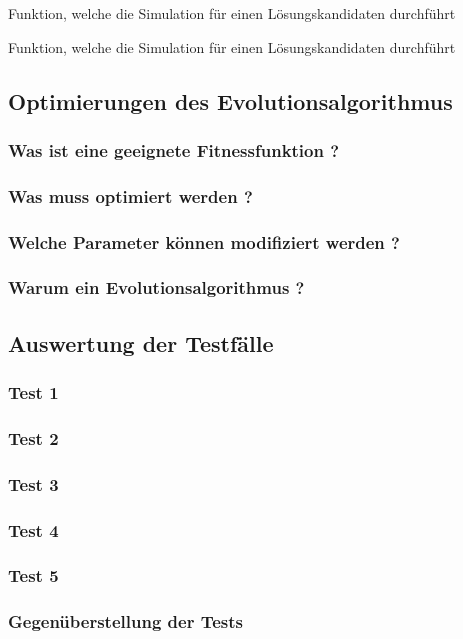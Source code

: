 \begin{code}
\caption{Funktion, welche die Simulation für einen Lösungskandidaten durchführt}
\label{fig:evaluate-m}
\end{code}

\begin{code}
\caption{Funktion, welche die Simulation für einen Lösungskandidaten durchführt}
\label{fig:moon-landing-m}
\end{code}

\newpage
\subsection{Optimierungen des Evolutionsalgorithmus}
\subsubsection{Was ist eine geeignete Fitnessfunktion ?}
\subsubsection{Was muss optimiert werden ?}
\subsubsection{Welche Parameter können modifiziert werden ?}
\subsubsection{Warum ein Evolutionsalgorithmus ?}

\newpage
\subsection{Auswertung der Testfälle}
\subsubsection{Test 1}
\subsubsection{Test 2}
\subsubsection{Test 3}
\subsubsection{Test 4}
\subsubsection{Test 5}
\subsubsection{Gegenüberstellung der Tests}